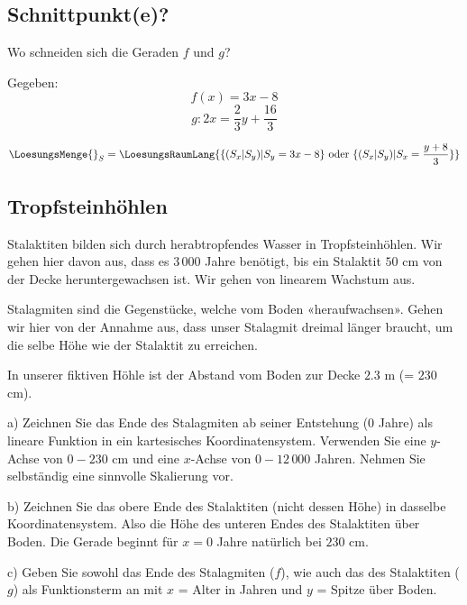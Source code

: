 \subsection{Schnittpunkt(e)?}
Wo schneiden sich die Geraden $f$ und $g$?

Gegeben:
$$f(x) = 3x - 8$$
$$g: 2x=\frac23y+\frac{16}3$$

\vspace{5mm}
$$\LoesungsMenge{}_S=\LoesungsRaumLang{\{ (S_x|S_y) | S_y = 3x-8  \} \text{ oder } \{ (S_x|S_y) | S_x = \frac{y+8}3  \}}$$
\subsection{Tropfsteinhöhlen}

Stalaktiten bilden sich durch herabtropfendes Wasser in Tropfsteinhöhlen.
Wir gehen hier davon aus, dass es $3\,000$ Jahre benötigt, bis ein
Stalaktit $50$ cm von der Decke heruntergewachsen ist. Wir gehen von
linearem Wachstum aus.

Stalagmiten sind die Gegenstücke, welche vom Boden
«heraufwachsen». Gehen wir hier von der Annahme aus, dass unser
Stalagmit dreimal länger braucht, um die selbe Höhe wie der Stalaktit zu erreichen.

In unserer fiktiven Höhle ist der Abstand vom Boden zur Decke $2.3$ m
(= $230$ cm).

a) Zeichnen Sie das Ende des Stalagmiten ab seiner Entstehung (0 Jahre) als
lineare Funktion in ein kartesisches Koordinatensystem. Verwenden Sie
eine $y$-Achse von $0 - 230$ cm und eine $x$-Achse von $0-12\,000$
Jahren. Nehmen Sie selbständig eine sinnvolle Skalierung vor.


b) Zeichnen Sie das obere Ende des Stalaktiten (nicht dessen Höhe) in
dasselbe Koordinatensystem. Also die Höhe des unteren Endes des
Stalaktiten über Boden. Die Gerade beginnt für $x=0$ Jahre
natürlich bei $230$ cm.
\newpage

c) Geben Sie sowohl das Ende des Stalagmiten ($f$), wie auch das des
Stalaktiten ($g$) als Funktionsterm an mit $x$ = Alter in Jahren und
$y$ = Spitze über Boden.


